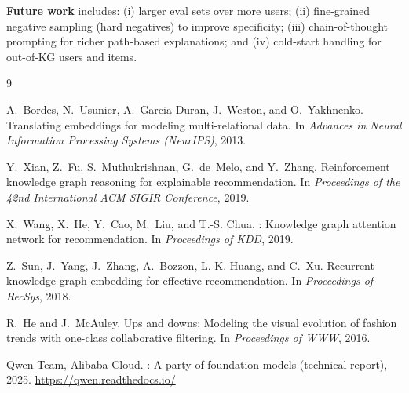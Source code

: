 \documentclass[12pt,a4paper]{article}
\begin{document}
\vspace{1em}
\noindent\textbf{Future work} includes: (i) larger eval sets over more users;
(ii) fine-grained negative sampling (hard negatives) to improve specificity;
(iii) chain-of-thought prompting for richer path-based explanations;
and (iv) cold-start handling for out-of-KG users and items.

\newpage
\begin{thebibliography}{9}

A.~Bordes, N.~Usunier, A.~Garcia-Duran, J.~Weston, and O.~Yakhnenko.
\newblock Translating embeddings for modeling multi-relational data.
\newblock In \emph{Advances in Neural Information Processing Systems (NeurIPS)}, 2013.

Y.~Xian, Z.~Fu, S.~Muthukrishnan, G.~de~Melo, and Y.~Zhang.
\newblock Reinforcement knowledge graph reasoning for explainable recommendation.
\newblock In \emph{Proceedings of the 42nd International ACM SIGIR Conference}, 2019.

X.~Wang, X.~He, Y.~Cao, M.~Liu, and T.-S. Chua.
: Knowledge graph attention network for recommendation.
\newblock In \emph{Proceedings of KDD}, 2019.

Z.~Sun, J.~Yang, J.~Zhang, A.~Bozzon, L.-K. Huang, and C.~Xu.
\newblock Recurrent knowledge graph embedding for effective recommendation.
\newblock In \emph{Proceedings of RecSys}, 2018.

R.~He and J.~McAuley.
\newblock Ups and downs: Modeling the visual evolution of fashion trends with
one-class collaborative filtering.
\newblock In \emph{Proceedings of WWW}, 2016.

Qwen Team, Alibaba Cloud.
: A party of foundation models (technical report), 2025.
\newblock \url{https://qwen.readthedocs.io/}

\end{thebibliography}
\end{document}
